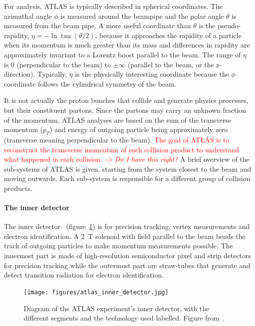 For analysis, ATLAS is typically described in spherical coordinates. The azimuthal angle $\phi$ is measured around the beampipe and the polar angle $\theta$ is measured from the beam pipe. A more useful coordinate than $\theta$ is the pseudo-rapidity, $\eta = -\ln\tan\left(\theta/2\right)$, because it approaches the rapidity of a particle when its momentum is much greater than its mass and differences in rapidity are approximately invariant to a Lorentz boost parallel to the beam. The range of $\eta$ is 0 (perpendicular to the beam) to $\pm\infty$ (parallel to the beam, or the z-direction). Typically, $\eta$ is the physically interesting coordinate because the $\phi$ coordinate follows the cylindrical symmetry of the beam.

It is not actually the proton bunches that collide and generate physics processes, but their constituent partons. Since the partons may carry an unknown fraction of the momentum, ATLAS analyses are based on the sum of the transverse momentum ($p_T$) and energy of outgoing particle being approximately zero (transverse meaning perpendicular to the beam). \textcolor{red}{The goal of ATLAS is to reconstruct the transverse momentum of each collision product to understand what happened in each collision. \textit{-> Do I have this right?}} A brief overview of the sub-systems of ATLAS is given, starting from the system closest to the beam and moving outwards. Each sub-system is responsible for a different group of collision products.

\paragraph*{The inner detector} \hfill \break
The inner detector~\cite{atlas_inner_detector_tdr_1, atlas_inner_detector_tdr_2} (figure~\ref{fig:atlas_inner_detector}) is for precision tracking, vertex measurements and electron identification. A \SI{2}{\tesla} solenoid with field parallel to the beam bends the track of outgoing particles to make momentum measurements possible. The innermost part is made of high-resolution semiconductor pixel and strip detectors for precision tracking while the outermost part are straw-tubes that generate and detect transition radiation for electron identification.

\begin{figure}
    \centering
    \texttt{[image: figures/atlas\_inner\_detector.jpg]}
    \caption{Diagram of the ATLAS experiment's inner detector, with the different segments and the technology used labelled. Figure from~\cite{collaboration_atlas_2008}.}
    \label{fig:atlas_inner_detector}
\end{figure}

